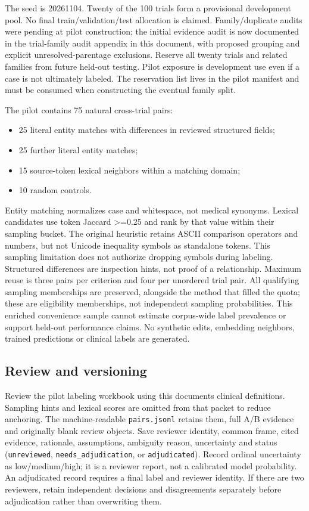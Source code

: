 \documentclass[10pt,letterpaper]{article}
\newcommand{\pathcode}[1]{\nolinkurl{#1}}
\begin{document}
The seed is 20261104. Twenty of the 100 trials form a provisional development pool. No final train/validation/test allocation is claimed. Family/duplicate audits were pending at pilot construction; the initial evidence audit is now documented in the trial-family audit appendix in this document, with proposed grouping and explicit unresolved-parentage exclusions. Reserve all twenty trials and related families from future held-out testing. Pilot exposure is development use even if a case is not ultimately labeled. The reservation list lives in the pilot manifest and must be consumed when constructing the eventual family split.

The pilot contains 75 natural cross-trial pairs:

\begin{itemize}
\item
  25 literal entity matches with differences in reviewed structured fields;
\item
  25 further literal entity matches;
\item
  15 source-token lexical neighbors within a matching domain;
\item
  10 random controls.
\end{itemize}

Entity matching normalizes case and whitespace, not medical synonyms. Lexical candidates use token Jaccard \textgreater=0.25 and rank by that value within their sampling bucket. The original heuristic retains ASCII comparison operators and numbers, but not Unicode inequality symbols as standalone tokens. This sampling limitation does not authorize dropping symbols during labeling. Structured differences are inspection hints, not proof of a relationship. Maximum reuse is three pairs per criterion and four per unordered trial pair. All qualifying sampling memberships are preserved, alongside the method that filled the quota; these are eligibility memberships, not independent sampling probabilities. This enriched convenience sample cannot estimate corpus-wide label prevalence or support held-out performance claims. No synthetic edits, embedding neighbors, trained predictions or clinical labels are generated.

\subsection{Review and versioning}\label{contract02-review-and-versioning}

Review the pilot labeling workbook using this document\textquotesingle s clinical definitions. Sampling hints and lexical scores are omitted from that packet to reduce anchoring. The machine-readable \pathcode{pairs.jsonl} retains them, full A/B evidence and originally blank review objects. Save reviewer identity, common frame, cited evidence, rationale, assumptions, ambiguity reason, uncertainty and status (\pathcode{unreviewed}, \pathcode{needs_adjudication}, or \pathcode{adjudicated}). Record ordinal uncertainty as low/medium/high; it is a reviewer report, not a calibrated model probability. An adjudicated record requires a final label and reviewer identity. If there are two reviewers, retain independent decisions and disagreements separately before adjudication rather than overwriting them.
\end{document}
